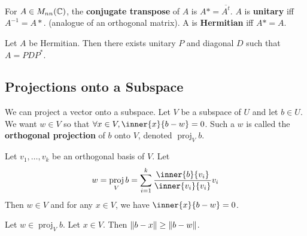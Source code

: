 \documentclass{article}
\DeclareMathOperator{\proj}{proj}
\begin{document}
    \begin{definition}
      For $A \in M_{nn}(\mathbb{C})$, the \textbf{conjugate transpose} of $A$ is $A* = \overline{A^t}$. $A$ is \textbf{unitary} iff $A^{-1} = A*$. (analogue of an orthogonal matrix). A is \textbf{Hermitian} iff $A* = A$.
    \end{definition}
    \begin{theorem}
      Let $A$ be Hermitian. Then there exists unitary $P$ and diagonal $D$ such that $A = PDP^*$.
    \end{theorem}
    \subsection{Projections onto a Subspace}
    \begin{definition}
      We can project a vector onto a subspace. Let $V$ be a subspace of $U$ and let $b \in U$. We want $w \in V$ so that $\forall x \in V, \inner{x}{b-w} = 0$. Such a $w$ is called the \textbf{orthogonal projection} of $b$ onto $V$, denoted $\proj_Vb$.
    \end{definition}
    \begin{theorem}
      Let $v_1, \ldots, v_k$ be an orthogonal basis of $V$. Let \[
        w = \proj_Vb = \sum_{i=1}^k \frac{\inner{b}{v_i}}{\inner{v_i}{v_i}}v_i
      \]
      Then $w \in V$ and for any $x \in V$, we have $\inner{x}{b-w} = 0$.
    \end{theorem}
    \begin{theorem}
      Let $w \in \proj_Vb$. Let $x \in V$. Then $\norm{b-x} \geq \norm{b-w}$.
    \end{theorem}
\end{document}
